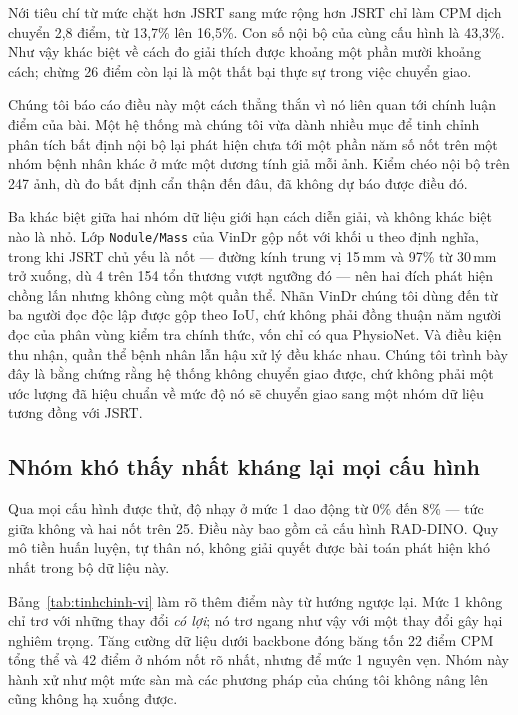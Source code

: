 \documentclass[12pt,a4paper]{article}
\begin{document}
Nới tiêu chí từ mức chặt hơn JSRT sang mức rộng hơn JSRT chỉ làm CPM dịch chuyển
2,8 điểm, từ 13,7\% lên 16,5\%. Con số nội bộ của cùng cấu hình là 43,3\%. Như
vậy khác biệt về cách đo giải thích được khoảng một phần mười khoảng cách; chừng
26 điểm còn lại là một thất bại thực sự trong việc chuyển giao.

Chúng tôi báo cáo điều này một cách thẳng thắn vì nó liên quan tới chính luận
điểm của bài. Một hệ thống mà chúng tôi vừa dành nhiều mục để tinh chỉnh phân
tích bất định nội bộ lại phát hiện chưa tới một phần năm số nốt trên một nhóm
bệnh nhân khác ở mức một dương tính giả mỗi ảnh. Kiểm chéo nội bộ trên 247 ảnh,
dù đo bất định cẩn thận đến đâu, đã không dự báo được điều đó.

Ba khác biệt giữa hai nhóm dữ liệu giới hạn cách diễn giải, và không khác biệt
nào là nhỏ. Lớp \texttt{Nodule/Mass} của VinDr gộp nốt với khối u theo định
nghĩa, trong khi JSRT chủ yếu là nốt --- đường kính trung vị 15\,mm và 97\% từ
30\,mm trở xuống, dù 4 trên 154 tổn thương vượt ngưỡng đó --- nên hai đích phát
hiện chồng lấn nhưng không cùng một quần thể. Nhãn VinDr chúng tôi dùng đến từ ba
người đọc độc lập được gộp theo IoU, chứ không phải đồng thuận năm người đọc của
phân vùng kiểm tra chính thức, vốn chỉ có qua PhysioNet. Và điều kiện thu nhận,
quần thể bệnh nhân lẫn hậu xử lý đều khác nhau. Chúng tôi trình bày đây là bằng
chứng rằng hệ thống không chuyển giao được, chứ không phải một ước lượng đã hiệu
chuẩn về mức độ nó sẽ chuyển giao sang một nhóm dữ liệu tương đồng với JSRT.

\subsection{Nhóm khó thấy nhất kháng lại mọi cấu hình}
\label{sec:san-vi}

Qua mọi cấu hình được thử, độ nhạy ở mức 1 dao động từ 0\% đến 8\% --- tức giữa
không và hai nốt trên 25. Điều này bao gồm cả cấu hình RAD-DINO. Quy mô tiền huấn
luyện, tự thân nó, không giải quyết được bài toán phát hiện khó nhất trong bộ dữ
liệu này.

Bảng~\ref{tab:tinhchinh-vi} làm rõ thêm điểm này từ hướng ngược lại. Mức 1 không
chỉ trơ với những thay đổi \emph{có lợi}; nó trơ ngang như vậy với một thay đổi
gây hại nghiêm trọng. Tăng cường dữ liệu dưới backbone đóng băng tốn 22 điểm CPM
tổng thể và 42 điểm ở nhóm nốt rõ nhất, nhưng để mức 1 nguyên vẹn. Nhóm này hành
xử như một mức sàn mà các phương pháp của chúng tôi không nâng lên cũng không hạ
xuống được.
\end{document}
